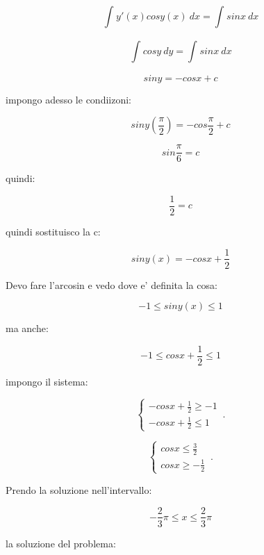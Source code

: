 \documentclass[11pt]{article}
\begin{document}
\[
    \int_{}^{} {y'(x) cosy(x)} \: dx = \int_{}^{} {sinx} \: dx 
\]

\[
    \int_{}^{} {cosy} \: dy = \int_{}^{} {sinx} \: dx 
\]

\[
    sin y = -cos x +c
\]

impongo adesso le condiizoni:

\[
    sin y( \frac{\pi}{2}) = - cos \frac{\pi}{2} + c
\]

\[
    sin \frac{\pi}{6} = c
\]

quindi:

\[
    \frac{1}{2}=c
\]

quindi sostituisco la c:

\[
    sin y(x) = - cos x + \frac{1}{2}
\]

Devo fare l'arcosin e vedo dove e' definita la cosa:

\[
    -1 \le sin y(x) \le 1
\]

ma anche:

\[
    -1 \le cosx + \frac{1}{2} \le 1
\]

impongo il sistema:

    \begin{equation}
        \begin{cases}
            -cosx +\frac{1}{2}\ge -1\\
            -cos x + \frac{1}{2} \le 1
        \end{cases}\,.
    \end{equation}

    \begin{equation}
        \begin{cases}
            cosx \le  \frac{3}{2}\\
            cosx \ge -\frac{1}{2}
        \end{cases}\,.
    \end{equation}


Prendo la soluzione nell'intervallo:

\[
    -\frac{2}{3}\pi \le  x \le  \frac{2}{3}\pi
\]

la soluzione del problema: 
\end{document}
